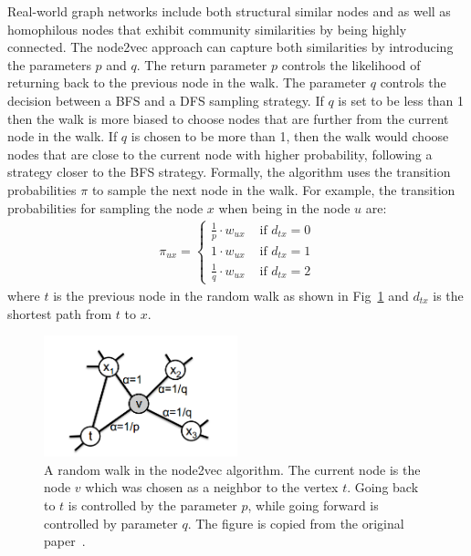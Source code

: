 Real-world graph networks include both structural similar nodes and as well as
homophilous nodes that exhibit community similarities by being highly connected.
The node2vec approach can capture both similarities by introducing the parameters
$p$ and $q$. The return parameter $p$ controls the likelihood of returning back
to the previous node in the walk. The parameter $q$ controls the decision
between a BFS and a DFS sampling strategy. If $q$ is set to be less than 1
then the walk is more biased to choose nodes that are further from the current
node in the walk. If $q$ is chosen to be more than 1, then the walk would choose
nodes that are close to the current node with higher probability, following a
strategy closer to the BFS strategy. Formally, the algorithm uses the transition
probabilities $\pi$ to sample the next node in the walk. For example, the
transition probabilities for sampling the node $x$ when being in the node $u$ are:
\begin{align}
\pi_{ux} = \begin{cases} \frac{1}{p}\cdot w_{ux} & \text{ if } d_{tx} = 0 \\
1\cdot w_{ux} & \text{ if } d_{tx} = 1 \\
\frac{1}{q}\cdot w_{ux} & \text{ if } d_{tx} = 2
\end{cases}
\end{align}
where $t$ is the previous node in the random walk as shown in
Fig~\ref{node2vec_png} and $d_{tx}$ is the shortest path from $t$ to $x$.
\begin{figure}
\begin{center}
\includegraphics[width=0.5\textwidth]{figures/node2vec.png}
\end{center}
\caption{A random walk in the node2vec algorithm. The current node is the node
$v$ which was chosen as a neighbor to the vertex $t$.
Going back to $t$ is controlled by the parameter $p$, while going forward is
controlled by parameter $q$. The figure is copied from the original
paper~\cite{grover2016node2vec}.}
\label{node2vec_png}
\end{figure}

